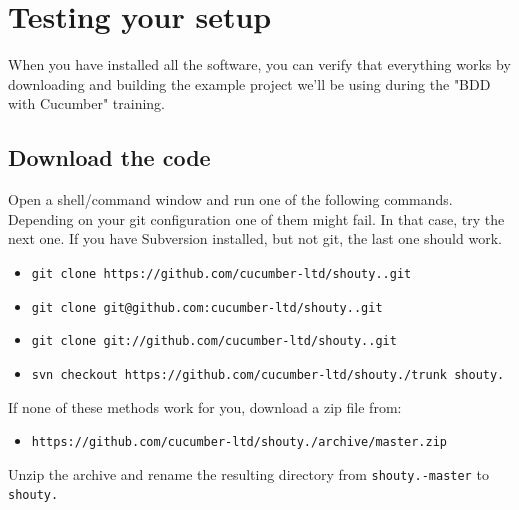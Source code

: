 \documentclass[a4paper,12pt]{report}
\begin{document}
\section*{Testing your setup}

When you have installed all the software, you can verify that everything works by downloading and building the example project we'll be using during the "BDD with Cucumber" training.

\subsection*{Download the code}

Open a shell/command window and run one of the following commands. Depending on your git configuration one of them might fail. In that case, try the next one. If you have Subversion installed, but not git, the last one should work.

\begin{itemize}

    \item \texttt{git clone https://github.com/cucumber-ltd/shouty..git}
    \item \texttt{git clone git@github.com:cucumber-ltd/shouty..git}
    \item \texttt{git clone git://github.com/cucumber-ltd/shouty..git}
    \item \texttt{svn checkout https://github.com/cucumber-ltd/shouty./trunk shouty.}
\end{itemize}

If none of these methods work for you, download a zip file from:
\begin{itemize}
    \item \texttt{https://github.com/cucumber-ltd/shouty./archive/master.zip}

\end{itemize}

Unzip the archive and rename the resulting directory from \texttt{shouty.-master} to \texttt{shouty.}
\end{document}
